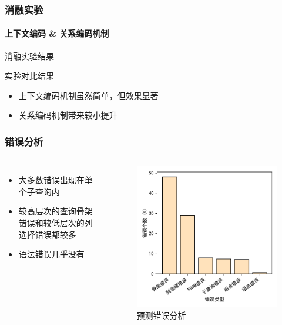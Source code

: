 \documentclass{ctexbeamer}
\begin{document}
\begin{frame}
  \frametitle{消融实验}
  \framesubtitle{上下文编码 \& 关系编码机制}
  \begin{table}
    
    \caption{消融实验结果}
  \end{table}
  \begin{block}{实验对比结果}
    \begin{itemize}
      \item 上下文编码机制虽然简单，但效果显著
      \item 关系编码机制带来较小提升
    \end{itemize}
  \end{block}
\end{frame}
\begin{frame}
  \frametitle{错误分析}
  \begin{columns}
    \begin{itemize}
      \item 大多数错误出现在单个子查询内
      \item 较高层次的查询骨架错误和较低层次的列选择错误都较多
      \item 语法错误几乎没有
    \end{itemize}
    \begin{figure}
      \includegraphics[height=0.7\textheight]{figure/error.pdf}
      \caption{预测错误分析}
    \end{figure}
  \end{columns}
\end{frame}
\end{document}
